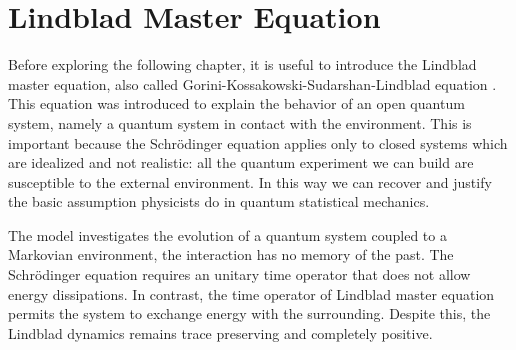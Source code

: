 \chapter{Lindblad Master Equation}\label{C_Lindblad}
Before exploring the following chapter, it is useful to introduce the Lindblad master equation, also called Gorini-Kossakowski-Sudarshan-Lindblad equation \cite{Lindblad,G_K_S}. This equation was introduced to explain the behavior of an open quantum system, namely a quantum system in contact with the environment. This is important because the Schrödinger equation applies only to closed systems which are idealized and not realistic: all the quantum experiment we can build are susceptible to the external environment.
In this way we can recover and justify the basic assumption physicists do in quantum statistical mechanics.

The model investigates the evolution of a quantum system coupled to a Markovian environment, the interaction has no memory of the past.  
The Schrödinger equation requires an unitary time operator that does not allow energy dissipations. In contrast, the time operator of Lindblad master equation permits the system to exchange energy with the surrounding. 
Despite this, the Lindblad dynamics remains trace preserving and completely positive.

